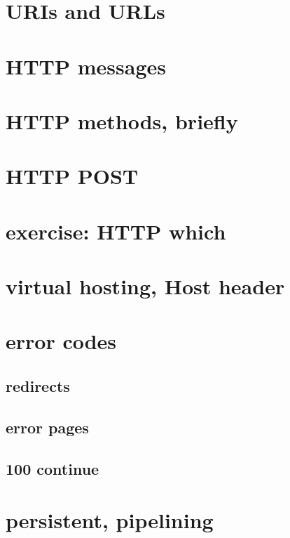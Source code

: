 \section{URIs and URLs}


\section{HTTP messages}


\section{HTTP methods, briefly}


\section{HTTP POST}


\section{exercise: HTTP which}


\section{virtual hosting, Host header}


\section{error codes}


\subsection{redirects}


\subsection{error pages}


\subsection{100 continue}


\section{persistent, pipelining}


